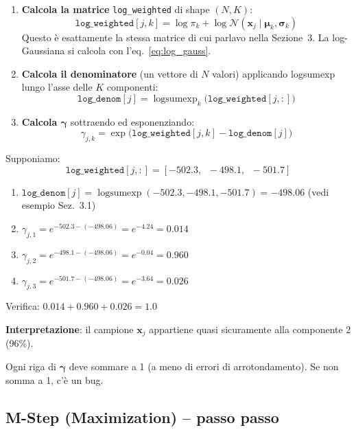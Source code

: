 \documentclass[11pt,a4paper]{article}
\begin{document}
\begin{enumerate}
    \item \textbf{Calcola la matrice} \texttt{log\_weighted} di shape $(N, K)$:
    $$\texttt{log\_weighted}[j, k] = \log\pi_k + \log\mathcal{N}(\mathbf{x}_j\mid\boldsymbol{\mu}_k, \boldsymbol{\sigma}_k)$$
    Questo \`e esattamente la stessa matrice di cui parlavo nella Sezione~3. La log-Gaussiana si calcola con l'eq.~\eqref{eq:log_gauss}.

    \item \textbf{Calcola il denominatore} (un vettore di $N$ valori) applicando logsumexp lungo l'asse delle $K$ componenti:
    $$\texttt{log\_denom}[j] = \operatorname{logsumexp}_k\!\bigl(\texttt{log\_weighted}[j, :]\bigr)$$

    \item \textbf{Calcola $\boldsymbol{\gamma}$} sottraendo ed esponenziando:
    $$\gamma_{j,k} = \exp\!\bigl(\texttt{log\_weighted}[j,k] - \texttt{log\_denom}[j]\bigr)$$
\end{enumerate}

\begin{exbox}[Esempio numerico per un campione $j$ con $K=3$]
Supponiamo:
$$\texttt{log\_weighted}[j, :] = [-502.3, \;\; -498.1, \;\; -501.7]$$
\begin{enumerate}
    \item $\texttt{log\_denom}[j] = \operatorname{logsumexp}(-502.3, -498.1, -501.7) = -498.06$ \quad (vedi esempio Sez.~3.1)
    \item $\gamma_{j,1} = e^{-502.3 - (-498.06)} = e^{-4.24} = 0.014$
    \item $\gamma_{j,2} = e^{-498.1 - (-498.06)} = e^{-0.04} = 0.960$
    \item $\gamma_{j,3} = e^{-501.7 - (-498.06)} = e^{-3.64} = 0.026$
\end{enumerate}
Verifica: $0.014 + 0.960 + 0.026 = 1.0$ {\color{green!50!black}\checkmark}

\textbf{Interpretazione}: il campione $\mathbf{x}_j$ appartiene quasi sicuramente alla componente 2 (96\%).
\end{exbox}

\begin{warnbox}
Ogni riga di $\boldsymbol{\gamma}$ deve sommare a 1 (a meno di errori di arrotondamento). Se non somma a 1, c'\`e un bug.
\end{warnbox}

\subsection{M-Step (Maximization) -- passo passo}
\end{document}
